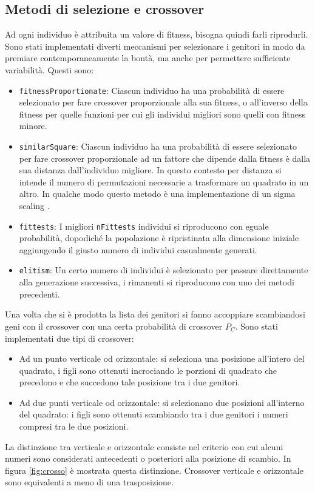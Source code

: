 \documentclass[italian,twoside,twocolumn]{article}
\begin{document}
\subsection{Metodi di selezione e crossover}
Ad ogni individuo è attribuita un valore di fitness, bisogna quindi farli riprodurli. Sono stati implementati diverti meccanismi per selezionare i genitori in modo da premiare contemporaneamente la bontà, ma anche per permettere sufficiente variabilità. Questi sono:
\begin{itemize}
	\item \texttt{fitnessProportionate}: Ciascun individuo ha una probabilità di essere selezionato per fare crossover proporzionale alla sua fitness, o all'inverso della fitness per quelle funzioni per cui gli individui migliori sono quelli con fitness minore.  
	\item \texttt{similarSquare}: Ciascun individuo ha una probabilità di essere selezionato per fare crossover proporzionale ad un fattore che dipende dalla fitness è dalla sua distanza dall'individuo migliore. In questo contesto per distanza si intende il numero di permutazioni necessarie a trasformare un quadrato in un altro. In qualche modo questo metodo è una implementazione di un sigma scaling \cite{Mitchell:1998}.
	\item \texttt{fittests}: I migliori \texttt{nFittests} individui si riproducono con eguale probabilità, dopodiché la popolazione è ripristinata alla dimensione iniziale aggiungendo il giusto numero di individui casualmente generati. 
	\item \texttt{elitism}: Un certo numero di individui è selezionato per passare direttamente alla generazione successiva, i rimanenti si riproducono con uno dei metodi precedenti.
\end{itemize}
Una volta che si è prodotta la lista dei genitori si fanno accoppiare scambiandosi geni con il crossover con una certa probabilità di crossover $ P_C $. Sono stati implementati due tipi di crossover:
\begin{itemize}
	\item Ad un punto verticale od orizzontale: si seleziona una posizione all'intero del quadrato, i figli sono ottenuti incrociando le porzioni di quadrato che precedono e che succedono tale posizione tra i due genitori. 
	\item Ad due punti verticale od orizzontale: si selezionano due posizioni all'interno del quadrato: i figli sono ottenuti scambiando tra i due genitori i numeri compresi tra le due posizioni.
\end{itemize}
La distinzione tra verticale e orizzontale consiste nel criterio con cui alcuni numeri sono considerati antecedenti o posteriori alla posizione di scambio. In figura \ref{fig:crosso} è mostrata questa distinzione. Crossover verticale e orizzontale sono equivalenti a meno di una trasposizione. 
\end{document}
